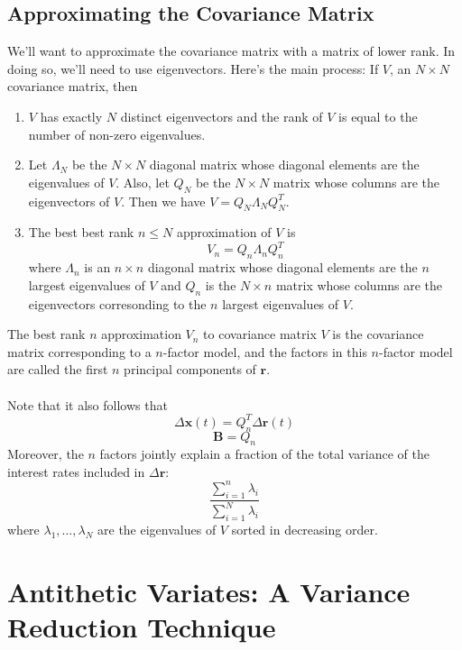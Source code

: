 \documentclass[a4paper,12pt]{scrartcl}
\begin{document}
\subsection{Approximating the Covariance Matrix}

We'll want to approximate the covariance matrix with a matrix
of lower rank.  In doing so, we'll need to use eigenvectors. Here's
the main process: If $V$, an $N\times N$ covariance
matrix, then
\begin{enumerate}
   \item $V$ has exactly $N$ distinct eigenvectors and the rank
      of $V$ is equal to the number of non-zero eigenvalues.
   \item Let $\Lambda_N$ be the $N\times N$ diagonal matrix
      whose diagonal elements are the eigenvalues of $V$. Also, 
      let $Q_N$ be the $N\times N$ matrix whose columns are the
      eigenvectors of $V$. Then we have $V = Q_N \Lambda_N Q_N^T$.
   \item The best best rank $n\leq N$ approximation of $V$ is
      \[ V_n = Q_n \Lambda_n Q_n^T \]
      where $\Lambda_n$ is an $n\times n$ diagonal matrix whose
      diagonal elements are the $n$ largest eigenvalues of $V$ and
      $Q_n$ is the $N\times n$ matrix whose columns are the 
      eigenvectors corresonding to the $n$ largest eigenvalues of $V$.
\end{enumerate}
The best rank $n$ approximation $V_n$ to covariance matrix $V$ is the
covariance matrix corresponding to a $n$-factor model, and
the factors in this $n$-factor model are called the first $n$
principal components of $\mathbf{r}$.
\\
\\
Note that it also follows that
   \[ \Delta \mathbf{x}(t) = Q_n^T \Delta\mathbf{r}(t) \]
   \[ \mathbf{B} = Q_n \]
Moreover, the $n$ factors jointly explain a fraction of the total
variance of the interest rates included in $\Delta \mathbf{r}$:
   \[ \frac{\sum^n_{i=1} \lambda_i}{\sum^N_{i=1}\lambda_i } \]
where $\lambda_1, \ldots, \lambda_N$ are the eigenvalues of $V$
sorted in decreasing order.


\newpage
\section{Antithetic Variates: A Variance Reduction Technique}
\end{document}
